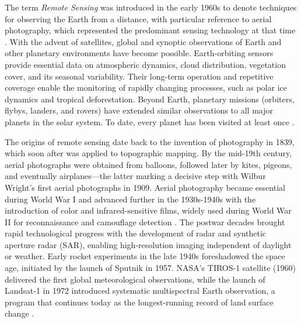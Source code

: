 The term \textit{Remote Sensing} was introduced in the early 1960s to denote techniques for observing the Earth from a distance, with particular reference to aerial photography, which represented the predominant sensing technology at that time \cite{book_Satellite_RS}.
With the advent of satellites, global and synoptic observations of Earth and other planetary environments have become possible. Earth-orbiting sensors provide essential data on atmospheric dynamics, cloud distribution, vegetation cover, and its seasonal variability. Their long-term operation and repetitive coverage enable the monitoring of rapidly changing processes, such as polar ice dynamics and tropical deforestation. Beyond Earth, planetary missions (orbiters, flybys, landers, and rovers) have extended similar observations to all major planets in the solar system. To date, every planet has been visited at least once \cite{book_Physics_Techniques_RS}.

The origins of remote sensing date back to the invention of photography in 1839, which soon after was applied to topographic mapping. By the mid-19th century, aerial photographs were obtained from balloons, followed later by kites, pigeons, and eventually airplanes—the latter marking a decisive step with Wilbur Wright's first aerial photographs in 1909. Aerial photography became essential during World War I and advanced further in the 1930s-1940s with the introduction of color and infrared-sensitive films, widely used during World War II for reconnaissance and camouflage detection \cite{book_Physics_Techniques_RS,book_Satellite_RS}.
The postwar decades brought rapid technological progress with the development of radar and synthetic aperture radar (SAR), enabling high-resolution imaging independent of daylight or weather. Early rocket experiments in the late 1940s foreshadowed the space age, initiated by the launch of Sputnik in 1957. NASA's TIROS-1 satellite (1960) delivered the first global meteorological observations, while the launch of Landsat-1 in 1972 introduced systematic multispectral Earth observation, a program that continues today as the longest-running record of land surface change \cite{book_Physics_Techniques_RS,book_Satellite_RS}.

